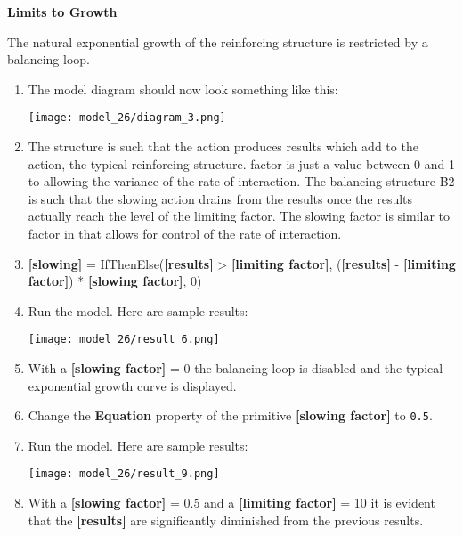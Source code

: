 \documentclass[]{memoir}
\makeatletter
\def\maxwidth{\ifdim\Gin@nat@width>\linewidth\linewidth
\else\Gin@nat@width\fi}
\let\Oldincludegraphics\includegraphics
\renewcommand{\includegraphics}[1]{\Oldincludegraphics[width=\maxwidth]{#1}}
\newcommand{\p}[1]{\textbf{{[}#1{]}}}
\newcommand{\e}[1]{\texttt{#1}}
\renewcommand{\a}[1]{\textbf{#1}}
\makeatother
\begin{document}
\begin{oframed}\textbf{Limits to Growth} 

 The natural exponential growth of the reinforcing structure is restricted by a balancing loop.

\begin{enumerate}
\item The model diagram should now look something like this: \par \begin{minipage}{\linewidth}  \centering \texttt{[image: model\_26/diagram\_3.png]}
\end{minipage}
\item 

The structure is such that the action produces results which add to the action, the typical reinforcing structure. factor is just a value between 0 and 1 to allowing the variance of the rate of interaction. The balancing structure B2 is such that the slowing action drains from the results once the results actually reach the level of the limiting factor. The slowing factor is similar to factor in that allows for control of the rate of interaction.


\item 

\p{slowing} = IfThenElse(\p{results} > \p{limiting factor}, (\p{results} - \p{limiting factor}) * \p{slowing factor}, 0)


\item Run the model. Here are sample results:\par \begin{minipage}{\linewidth}  \centering \texttt{[image: model\_26/result\_6.png]}
\end{minipage}
\item 

With a \p{slowing factor} = 0 the balancing loop is disabled and the typical exponential growth curve is displayed.


\item  Change the \a{Equation} property of the primitive \p{slowing factor} to \e{0.5}.
\item Run the model. Here are sample results:\par \begin{minipage}{\linewidth}  \centering \texttt{[image: model\_26/result\_9.png]}
\end{minipage}
\item 

With a \p{slowing factor} = 0.5 and a \p{limiting factor} = 10 it is evident that the \p{results} are significantly diminished from the previous results.



\end{enumerate}
\end{oframed}
\end{document}
